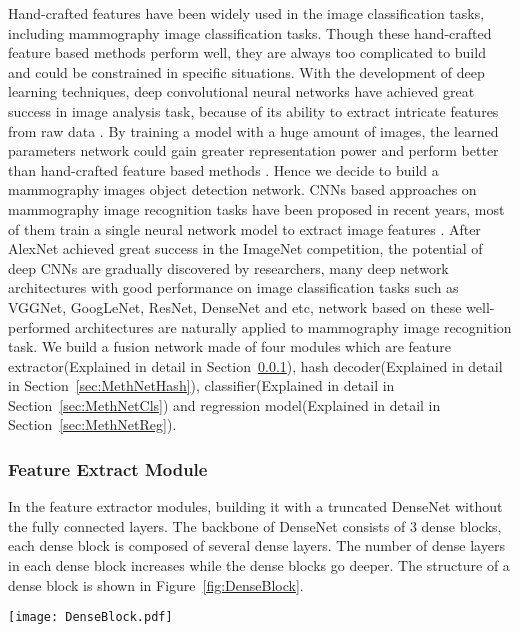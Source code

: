 Hand-crafted features have been widely used in the
image classification tasks, including mammography 
image classification tasks. Though these 
hand-crafted feature based methods perform well, 
they are always too complicated to build and could 
be constrained in specific situations. With the 
development of deep learning techniques, deep 
convolutional neural networks have achieved 
great success in image analysis task, because of 
its ability to extract intricate features from 
raw data
\cite{Szegedy2016,Zeiler2014}.
By training a model with a huge amount of images, 
the learned parameters network could gain greater 
representation power and perform better than 
hand-crafted feature based methods
\cite{Jamieson2012}.
Hence we decide to build a mammography images 
object detection network. CNNs based approaches 
on mammography image 
recognition tasks have been proposed in recent 
years, most of them train a single neural network 
model to extract image features
\cite{He2019}.
After AlexNet achieved great success in the 
ImageNet competition, the potential of deep CNNs 
are gradually discovered by researchers, many deep 
network architectures with good performance on 
image classification tasks such as VGGNet, 
GoogLeNet, ResNet, DenseNet and etc, network 
based on these well-performed architectures are 
naturally applied to mammography image recognition 
task. We build a fusion network made of four 
modules which are feature extractor(Explained 
in detail in 
Section~\ref{sec:MethNetFea}), 
hash decoder(Explained in detail in 
Section~\ref{sec:MethNetHash}),
classifier(Explained in detail in 
Section~\ref{sec:MethNetCls}) 
and regression model(Explained in detail in 
Section~\ref{sec:MethNetReg}). 

\subsubsection{Feature Extract Module}
\label{sec:MethNetFea}

In the feature extractor modules, building it 
with a truncated DenseNet without the fully 
connected layers. The backbone of DenseNet
consists of 3 dense blocks, each dense block 
is composed of several dense layers. The 
number of dense layers in each dense block 
increases while the dense blocks go deeper.
The structure of a dense block is shown in 
Figure~\ref{fig:DenseBlock}.

\begin{figure*}[!ht]
    \centering
    \texttt{[image: DenseBlock.pdf]}
    \caption{The architecture of DenseNet.}
    \label{fig:DenseBlock}
\end{figure*} 

